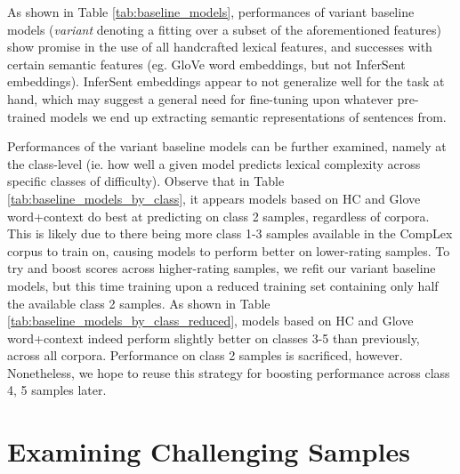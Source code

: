 \documentclass{dcthesis}
\theoremstyle{definition}
\theoremstyle{remark}
\begin{document}
As shown in Table \ref{tab:baseline_models}, performances of variant baseline models (\textit{variant} denoting a fitting over a subset of the aforementioned features) show promise in the use of all handcrafted lexical features, and successes with certain semantic features (eg. GloVe word embeddings, but not InferSent embeddings). InferSent embeddings appear to not generalize well for the task at hand, which may suggest a general need for fine-tuning upon whatever pre-trained models we end up extracting semantic representations of sentences from.

Performances of the variant baseline models can be further examined, namely at the class-level (ie. how well a given model predicts lexical complexity across specific classes of difficulty). Observe that in Table \ref{tab:baseline_models_by_class}, it appears models based on HC and Glove word+context do best at predicting on class 2 samples, regardless of corpora. This is likely due to there being more class 1-3 samples available in the CompLex corpus to train on, causing models to perform better on lower-rating samples. To try and boost scores across higher-rating samples, we refit our variant baseline models, but this time training upon a reduced training set containing only half the available class 2 samples. As shown in Table \ref{tab:baseline_models_by_class_reduced}, models based on HC and Glove word+context indeed perform slightly better on classes 3-5 than previously, across all corpora. Performance on class 2 samples is sacrificed, however. Nonetheless, we hope to reuse this strategy for boosting performance across class 4, 5 samples later. 

\section{Examining Challenging Samples}

\label{sec:examining_challenging_samples}
\end{document}
